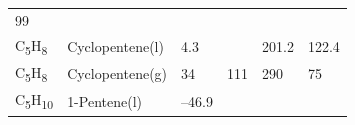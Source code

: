 \documentclass[
  9pt,
]{extbook}
\theoremstyle{definition}
\theoremstyle{definition}
\theoremstyle{definition}
\theoremstyle{remark}
\begin{document}
\begin{longtable}[]{@{}llllll@{}}
\begin{minipage}[t]{0.14\columnwidth}
99\strut
\end{minipage}\tabularnewline
\begin{minipage}[t]{0.07\columnwidth}\raggedright
C\textsubscript{5}H\textsubscript{8}\strut
\end{minipage} & \begin{minipage}[t]{0.17\columnwidth}\raggedright
Cyclopentene(l)\strut
\end{minipage} & \begin{minipage}[t]{0.15\columnwidth}\raggedright
4.3\strut
\end{minipage} & \begin{minipage}[t]{0.15\columnwidth}\raggedright
\strut
\end{minipage} & \begin{minipage}[t]{0.14\columnwidth}\raggedright
201.2\strut
\end{minipage} & \begin{minipage}[t]{0.14\columnwidth}\raggedright
122.4\strut
\end{minipage}\tabularnewline
\begin{minipage}[t]{0.07\columnwidth}\raggedright
C\textsubscript{5}H\textsubscript{8}\strut
\end{minipage} & \begin{minipage}[t]{0.17\columnwidth}\raggedright
Cyclopentene(g)\strut
\end{minipage} & \begin{minipage}[t]{0.15\columnwidth}\raggedright
34\strut
\end{minipage} & \begin{minipage}[t]{0.15\columnwidth}\raggedright
111\strut
\end{minipage} & \begin{minipage}[t]{0.14\columnwidth}\raggedright
290\strut
\end{minipage} & \begin{minipage}[t]{0.14\columnwidth}\raggedright
75\strut
\end{minipage}\tabularnewline
\begin{minipage}[t]{0.07\columnwidth}\raggedright
C\textsubscript{5}H\textsubscript{10}\strut
\end{minipage} & \begin{minipage}[t]{0.17\columnwidth}\raggedright
1-Pentene(l)\strut
\end{minipage} & \begin{minipage}[t]{0.15\columnwidth}\raggedright
--46.9\strut
\end{minipage} & \begin{minipage}[t]{0.15\columnwidth}\raggedright

\end{minipage}
\end{longtable}
\end{document}
